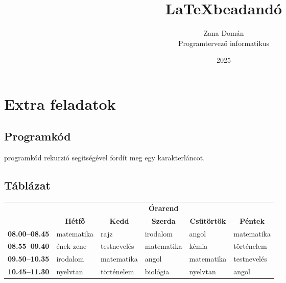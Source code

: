 \documentclass{thesis-ekf}
\theoremstyle{definition}
\theoremstyle{remark}
\begin{document}
\title{\LaTeX beadandó}
\author{Zana Domán\\Programtervező informatikus}
\date{2025}
\maketitle

\tableofcontents

\chapter{Extra feladatok}

\section{Programkód}

 programkód rekurzió segítségével fordít meg egy karakterláncot.

\section{Táblázat}
\begin{table}[h]
    \centering
    \footnotesize
    \begin{tabular}{|>{\bfseries}l|l|l|l|l|l|}
        \cline{2-6}
        \multicolumn{1}{c|}{} & \multicolumn{5}{c|}{\textbf{Órarend}}\\
        \cline{2-6}
        \multicolumn{1}{c|}{} &
        \multicolumn{1}{c|}{\textbf{Hétfő}} &
        \multicolumn{1}{c|}{\textbf{Kedd}} &
        \multicolumn{1}{c|}{\textbf{Szerda}} &
        \multicolumn{1}{c|}{\textbf{Csütörtök}} &
        \multicolumn{1}{c|}{\textbf{Péntek}} \\
        \hline
        08.00--08.45 & matematika & rajz & irodalom & angol & matematika\\
        \hline
        08.55--09.40 & ének-zene & testnevelés & matematika & kémia & történelem\\
        \hline
        09.50--10.35 & irodalom & matematika & angol & matematika & testnevelés\\
        \hline
        10.45--11.30 & nyelvtan & történelem & biológia & nyelvtan & angol\\
        \hline
    \end{tabular}
\end{table}

\begin{thebibliography}{2}
\end{thebibliography}


\end{document}
